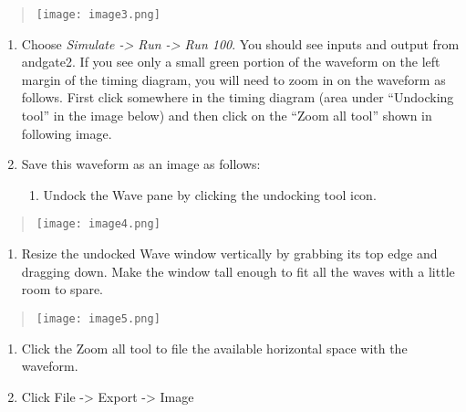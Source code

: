 \begin{quote}
    \texttt{[image: image3.png]}
\end{quote}

\begin{enumerate}
        \def\labelenumi{\arabic{enumi}.}
        \setcounter{enumi}{21}
    \item
        Choose \emph{Simulate -\textgreater{} Run -\textgreater{} Run 100}.
        You should see inputs and output from andgate2. If you see only a
        small green portion of the waveform on the left margin of the timing
        diagram, you will need to zoom in on the waveform as follows. First
        click somewhere in the timing diagram (area under ``Undocking tool''
        in the image below) and then click on the ``Zoom all tool'' shown in
        following image.
    \item
        \protect\hypertarget{Part_1_Step_23}{}{}Save this waveform as an image
        as follows:

        \begin{enumerate}
                \def\labelenumii{\alph{enumii}.}
            \item
                Undock the Wave pane by clicking the undocking tool icon.
        \end{enumerate}
\end{enumerate}

\begin{quote}
    \texttt{[image: image4.png]}
\end{quote}

\begin{enumerate}
        \def\labelenumi{\alph{enumi}.}
        \setcounter{enumi}{1}
    \item
        Resize the undocked Wave window vertically by grabbing its top edge
        and dragging down. Make the window tall enough to fit all the waves
        with a little room to spare.
\end{enumerate}

\begin{quote}
    \texttt{[image: image5.png]}
\end{quote}

\begin{enumerate}
        \def\labelenumi{\alph{enumi}.}
        \setcounter{enumi}{2}
    \item
        Click the Zoom all tool to file the available horizontal space with
        the waveform.
    \item
        Click File -\textgreater{} Export -\textgreater{} Image
\end{enumerate}

